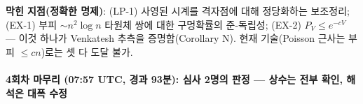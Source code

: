 \textbf{막힌 지점(정확한 명제)}: (LP-1) 사영된 시계를 격자점에 대해 정당화하는 보조정리; (EX-1) 부피 \(\sim n^2\log n\) 타원체 쌍에 대한 구멍확률의 준-독립성; (EX-2) \(P_V\le e^{-cV}\) --- 이것 하나가 Venkatesh 추측을 증명함(Corollary N\textquotesingle). 현재 기술(Poisson 근사는 부피 \(\le cn\))로는 셋 다 도달 불가.

\hypertarget{uxd68cuxcc28-uxb9c8uxbb34uxb9ac-0757-utc-uxacbduxacfc-93uxbd84-uxc2ecuxc0ac-2uxba85uxc758-uxd310uxc815-uxc0c1uxc218uxb294-uxc804uxbd80-uxd655uxc778-uxd574uxc11duxc740-uxb300uxd3ed-uxc218uxc815}{%
\paragraph{4회차 마무리 (07:57 UTC, 경과 93분): 심사 2명의 판정 --- 상수는 전부 확인, 해석은 대폭 수정}\label{uxd68cuxcc28-uxb9c8uxbb34uxb9ac-0757-utc-uxacbduxacfc-93uxbd84-uxc2ecuxc0ac-2uxba85uxc758-uxd310uxc815-uxc0c1uxc218uxb294-uxc804uxbd80-uxd655uxc778-uxd574uxc11duxc740-uxb300uxd3ed-uxc218uxc815}}

